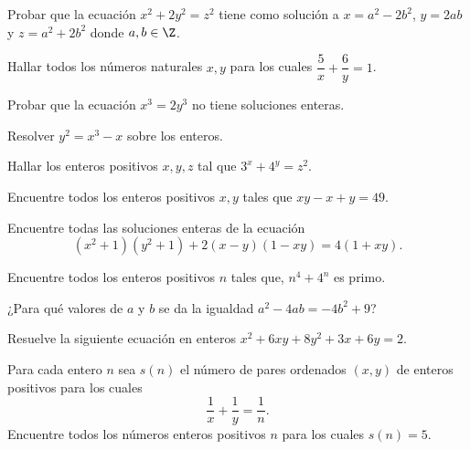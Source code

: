 \begin{exercise}
    Probar que la ecuación $x^2 + 2y^2 = z^2$ tiene como solución a $x = a^2 - 2b^2$, $y = 2ab$ y $z = a^2 + 2b^2$ donde $a, b \in \Z$.
\end{exercise}

\begin{exercise}
    Hallar todos los números naturales $x,y$ para los cuales $\dfrac{5}{x} + \dfrac{6}{y} = 1$.
\end{exercise}

\begin{exercise}
    Probar que la ecuación $x^3 = 2y^3$ no tiene soluciones enteras.
\end{exercise}

\begin{exercise}
    Resolver $y^2 = x^3 - x$ sobre los enteros.
\end{exercise}

\begin{exercise}
    Hallar los enteros positivos $x,y,z$ tal que $3^x + 4^y = z^2$.
\end{exercise}

\begin{exercise}
    Encuentre todos los enteros positivos $x, y$ tales que $xy - x + y = 49$.
\end{exercise}

\begin{exercise}
    Encuentre todas las soluciones enteras de la ecuación
    \[
        (x^2 + 1)(y^2 + 1) + 2(x - y)(1 - xy) = 4(1 + xy).
    \]
\end{exercise}

\begin{exercise}
    Encuentre todos los enteros positivos $n$ tales que, $n^4 + 4^n$ es primo.
\end{exercise}

\begin{exercise}
    ¿Para qué valores de $a$ y $b$ se da la igualdad $a^2 - 4ab = - 4b^2 + 9$?
\end{exercise}

\begin{exercise}
    Resuelve la siguiente ecuación en enteros $x^2 + 6xy + 8y^2 + 3x + 6y = 2$.
\end{exercise}

\begin{exercise}
    Para cada entero $n$ sea $s(n)$ el número de pares ordenados $(x, y)$ de enteros positivos para los cuales
    \[
        \frac{1}{x} + \frac{1}{y} = \frac{1}{n}.
    \]
    Encuentre todos los números enteros positivos $n$ para los cuales $s(n) = 5$.
\end{exercise}

